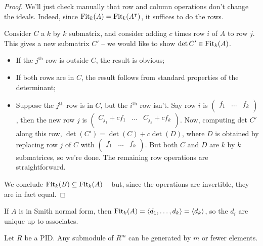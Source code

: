 \documentclass{../../template/note}
\begin{document}
    \begin{proof}
        We'll just check manually that row and column operations don't change the ideals. Indeed, since $\operatorname{Fit}_k(A) = \operatorname{Fit}_k(A^\intercal)$, it suffices to do the rows.

        Consider $C$ a $k$ by $k$ submatrix, and consider adding $c$ times row $i$ of $A$ to row $j$. This gives a new submatrix $C'$ -- we would like to show $\det C' \in \operatorname{Fit}_k(A)$.
        \begin{itemize}
            \item If the $j^\text{th}$ row is outside $C$, the result is obvious;
            \item If both rows are in $C$, the result follows from standard properties of the determinant;
            \item Suppose the $j^\text{th}$ row is in $C$, but the $i^\text{th}$ row isn't. Say row $i$ is $\begin{pmatrix}
                f_1 & \dots & f_k \\
            \end{pmatrix}$, then the new row $j$ is $\begin{pmatrix}
                C_{j_1}+cf_1 & \dots & C_{j_k}+cf_k \\
            \end{pmatrix}$. Now, computing det $C'$ along this row, $\det(C') = \det(C) + c\det(D)$, where $D$ is obtained by replacing row $j$ of $C$ with $\begin{pmatrix}
                f_1 & \dots & f_k \\
            \end{pmatrix}$. But both $C$ and $D$ are $k$ by $k$ submatrices, so we're done. The remaining row operations are straightforward.
        \end{itemize}
        We conclude $\operatorname{Fit}_k(B) \subseteq \operatorname{Fit}_k(A)$ -- but, since the operations are invertible, they are in fact equal.        
    \end{proof}

    \begin{corollary}
        If $A$ is in Smith normal form, then $\operatorname{Fit}_k(A) = \left \langle d_1, \dots, d_k \right \rangle = \left \langle d_k \right \rangle$, so the $d_i$ are unique up to associates.
    \end{corollary}
    
    \begin{proposition}
        \label{submodule-generation}
        Let $R$ be a PID. Any submodule of $R^m$ can be generated by $m$ or fewer elements.
    \end{proposition}
    
\end{document}
